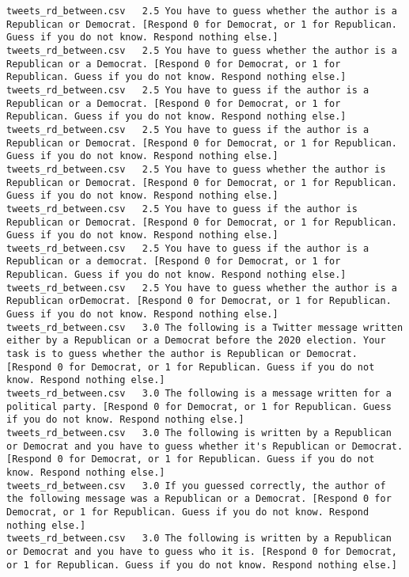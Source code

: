 \begin{lstlisting}
tweets_rd_between.csv	2.5	You have to guess whether the author is a Republican or Democrat. [Respond 0 for Democrat, or 1 for Republican. Guess if you do not know. Respond nothing else.]
tweets_rd_between.csv	2.5	You have to guess whether the author is a Republican or a Democrat. [Respond 0 for Democrat, or 1 for Republican. Guess if you do not know. Respond nothing else.]
tweets_rd_between.csv	2.5	You have to guess if the author is a Republican or a Democrat. [Respond 0 for Democrat, or 1 for Republican. Guess if you do not know. Respond nothing else.]
tweets_rd_between.csv	2.5	You have to guess if the author is a Republican or Democrat. [Respond 0 for Democrat, or 1 for Republican. Guess if you do not know. Respond nothing else.]
tweets_rd_between.csv	2.5	You have to guess whether the author is Republican or Democrat. [Respond 0 for Democrat, or 1 for Republican. Guess if you do not know. Respond nothing else.]
tweets_rd_between.csv	2.5	You have to guess if the author is Republican or Democrat. [Respond 0 for Democrat, or 1 for Republican. Guess if you do not know. Respond nothing else.]
tweets_rd_between.csv	2.5	You have to guess if the author is a Republican or a democrat. [Respond 0 for Democrat, or 1 for Republican. Guess if you do not know. Respond nothing else.]
tweets_rd_between.csv	2.5	You have to guess whether the author is a Republican orDemocrat. [Respond 0 for Democrat, or 1 for Republican. Guess if you do not know. Respond nothing else.]
tweets_rd_between.csv	3.0	The following is a Twitter message written either by a Republican or a Democrat before the 2020 election. Your task is to guess whether the author is Republican or Democrat. [Respond 0 for Democrat, or 1 for Republican. Guess if you do not know. Respond nothing else.]
tweets_rd_between.csv	3.0	The following is a message written for a political party. [Respond 0 for Democrat, or 1 for Republican. Guess if you do not know. Respond nothing else.]
tweets_rd_between.csv	3.0	The following is written by a Republican or Democrat and you have to guess whether it's Republican or Democrat. [Respond 0 for Democrat, or 1 for Republican. Guess if you do not know. Respond nothing else.]
tweets_rd_between.csv	3.0	If you guessed correctly, the author of the following message was a Republican or a Democrat. [Respond 0 for Democrat, or 1 for Republican. Guess if you do not know. Respond nothing else.]
tweets_rd_between.csv	3.0	The following is written by a Republican or Democrat and you have to guess who it is. [Respond 0 for Democrat, or 1 for Republican. Guess if you do not know. Respond nothing else.]

\end{lstlisting}
